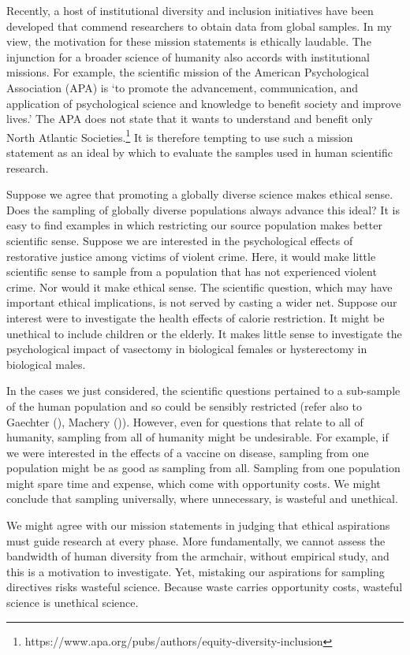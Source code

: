\documentclass[
  single column]{article}
\begin{document}
Recently, a host of institutional diversity and inclusion initiatives
have been developed that commend researchers to obtain data from global
samples. In my view, the motivation for these mission statements is
ethically laudable. The injunction for a broader science of humanity
also accords with institutional missions. For example, the scientific
mission of the American Psychological Association (APA) is `to promote
the advancement, communication, and application of psychological science
and knowledge to benefit society and improve lives.' The APA does not
state that it wants to understand and benefit only North Atlantic
Societies.\footnote{https://www.apa.org/pubs/authors/equity-diversity-inclusion}
It is therefore tempting to use such a mission statement as an ideal by
which to evaluate the samples used in human scientific research.

Suppose we agree that promoting a globally diverse science makes ethical
sense. Does the sampling of globally diverse populations always advance
this ideal? It is easy to find examples in which restricting our source
population makes better scientific sense. Suppose we are interested in
the psychological effects of restorative justice among victims of
violent crime. Here, it would make little scientific sense to sample
from a population that has not experienced violent crime. Nor would it
make ethical sense. The scientific question, which may have important
ethical implications, is not served by casting a wider net. Suppose our
interest were to investigate the health effects of calorie restriction.
It might be unethical to include children or the elderly. It makes
little sense to investigate the psychological impact of vasectomy in
biological females or hysterectomy in biological males.

In the cases we just considered, the scientific questions pertained to a
sub-sample of the human population and so could be sensibly restricted
(refer also to Gaechter (), Machery
()). However, even for questions that
relate to all of humanity, sampling from all of humanity might be
undesirable. For example, if we were interested in the effects of a
vaccine on disease, sampling from one population might be as good as
sampling from all. Sampling from one population might spare time and
expense, which come with opportunity costs. We might conclude that
sampling universally, where unnecessary, is wasteful and unethical.

We might agree with our mission statements in judging that ethical
aspirations must guide research at every phase. More fundamentally, we
cannot assess the bandwidth of human diversity from the armchair,
without empirical study, and this is a motivation to investigate. Yet,
mistaking our aspirations for sampling directives risks wasteful
science. Because waste carries opportunity costs, wasteful science is
unethical science.
\end{document}
